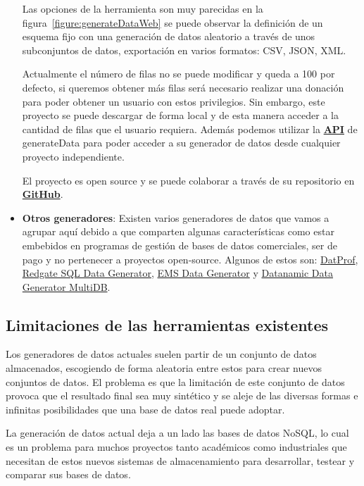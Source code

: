 \begin{itemize}
	Las opciones de la herramienta son muy parecidas en la figura~\ref{figure:generateDataWeb} se puede observar la definición de un esquema fijo con una generación de datos aleatorio a través de unos subconjuntos de datos, exportación en varios formatos: CSV, JSON, XML.

	Actualmente el número de filas no se puede modificar y queda a 100 por defecto, si queremos obtener más filas será necesario realizar una donación para poder obtener un usuario con estos privilegios. Sin embargo, este proyecto se puede descargar de forma local y de esta manera acceder a la cantidad de filas que el usuario requiera. Además podemos utilizar la \textbf{\href{http://benkeen.github.io/generatedata/api.html}{API}} de generateData para poder acceder a su generador de datos desde cualquier proyecto independiente.

	El proyecto es open source y se puede colaborar a través de su repositorio en \textbf{\href{https://github.com/benkeen/generatedata}{GitHub}}.

	\item \textbf{Otros generadores}: Existen varios generadores de datos que vamos a agrupar aquí debido a que comparten algunas características como estar embebidos en programas de gestión de bases de datos comerciales, ser de pago y no pertenecer a proyectos open-source. Algunos de estos son: \href{https://www.datprof.com/}{DatProf}, \href{https://www.red-gate.com/products/sql-development/sql-data-generator/}{Redgate SQL Data Generator}, \href{https://www.sqlmanager.net/products/mysql/datagenerator}{EMS Data Generator} y \href{https://www.datanamic.com/datagenerator/}{Datanamic Data Generator MultiDB}.

	\end{itemize}


\subsection{Limitaciones de las herramientas existentes}

Los generadores de datos actuales suelen partir de un conjunto de datos almacenados, escogiendo de forma aleatoria entre estos para crear nuevos conjuntos de datos. El problema es que la limitación de este conjunto de datos provoca que el resultado final sea muy sintético y se aleje de las diversas formas e infinitas posibilidades que una base de datos real puede adoptar.

La generación de datos actual deja a un lado las bases de datos NoSQL, lo cual es un problema para muchos proyectos tanto académicos como industriales que necesitan de estos nuevos sistemas de almacenamiento para desarrollar, testear y comparar sus bases de datos.

